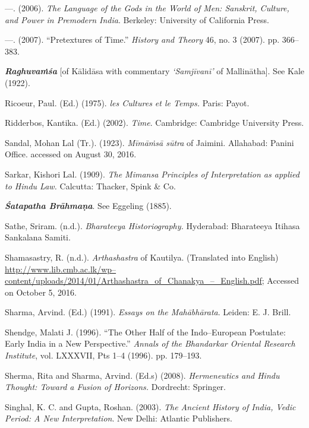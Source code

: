 \begin{thebibliography}{99}
  —. (2006). \textit{The Language of the Gods in the World of Men: Sanskrit, Culture, and Power in Premodern India}. Berkeley: University of California Press.

  —. (2007). “Pretextures of Time.” \textit{History and Theory} 46, no. 3 (2007). pp. 366–383.

  \textbf{\textit{Raghuvaṁśa}} [of Kālidāsa with commentary \textit{‘Samjīvanī’} of Mallinātha]. See Kale (1922).

  Ricoeur, Paul. (Ed.) (1975). \textit{les Cultures et le Temps.} Paris: Payot.

  Ridderbos, Kantika. (Ed.) (2002). \textit{Time}. Cambridge: Cambridge University Press.

  Sandal, Mohan Lal (Tr.). (1923). \textit{Mīmāṁsā sūtra} of Jaimini. Allahabad: Panini Office. accessed on August 30, 2016.

  Sarkar, Kishori Lal. (1909). \textit{The Mimansa Principles of Interpretation as applied to Hindu Law.} Calcutta: Thacker, Spink \& Co. 

  \textbf{\textit{Śatapatha Brāhmaṇa}}. See Eggeling (1885).

  Sathe, Sriram. (n.d.). \textit{Bharateeya Historiography.} Hyderabad: Bharateeya Itihasa Sankalana Samiti.

  Shamasastry, R. (n.d.). \textit{Arthashastra} of Kautilya. (Translated into English) \url{http://www.lib.cmb.ac.lk/wp–content/uploads/2014/01/Arthashastra_of_Chanakya_–_English.pdf}; Accessed on October 5, 2016.

  Sharma, Arvind. (Ed.) (1991). \textit{Essays on the Mahābhārata}. Leiden: E. J. Brill.

  Shendge, Malati J. (1996). “The Other Half of the Indo–European Postulate: Early India in a New Perspective.” \textit{Annals of the Bhandarkar Oriental Research Institute}, vol. LXXXVII, Pts 1–4 (1996). pp. 179–193.

  Sherma, Rita and Sharma, Arvind. (Ed.s) (2008). \textit{Hermeneutics and Hindu Thought: Toward a Fusion of Horizons.} Dordrecht: Springer.

  Singhal, K. C. and Gupta, Roshan. (2003). \textit{The Ancient History of India, Vedic Period: A New Interpretation}. New Delhi: Atlantic Publishers.


\end{thebibliography}
